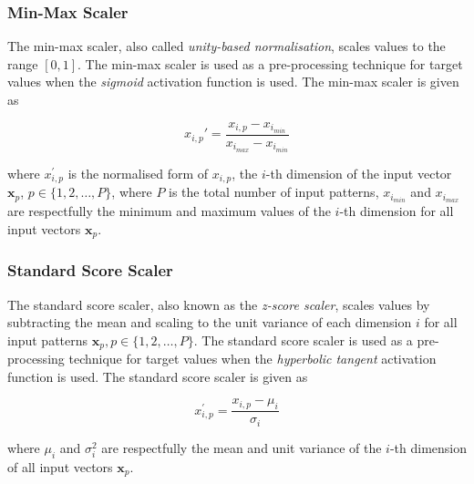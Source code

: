 \subsubsection{Min-Max Scaler}\label{sec:anns:an:input:min_max_scaler}

The min-max scaler, also called \textit{unity-based normalisation}, scales values to the range $[0,1]$. The min-max scaler is used as a pre-processing technique for target values when the \textit{sigmoid}  activation function is used. The min-max scaler is given as

\begin{equation}
      x_{i,p}'  = \frac{x_{i,p} - x_{i_{min}}}{x_{i_{max}} - x_{i_{min}}}
      \label{eq:min_max_scaler}
\end{equation}

where $x_{i,p}^{'}$ is the normalised form of $x_{i,p}$, the $i$-th dimension of the input vector $\boldsymbol{x}_p$, $p \in \{1,2, \dots, P \}$, where $P$ is the total number of input patterns, $x_{i_{min}}$ and $x_{i_{max}}$ are respectfully the minimum and maximum values of the $i$-th dimension for all input vectors $\boldsymbol{x}_p$.

\subsubsection{Standard Score Scaler}\label{sec:anns:an:input:standard_score_scaler}

The standard score scaler, also known as the \textit{z-score scaler}, scales values by subtracting the mean and scaling to the unit variance of each dimension $i$ for all input patterns $\boldsymbol{x}_p, p \in \{1,2, \dots, P\}$. The standard score scaler is used as a pre-processing technique for target values when the \textit{hyperbolic tangent} activation function is used. The standard score scaler is given as

\begin{equation}
      x_{i,p}^{'} = \frac{x_{i,p} - \mu_i}{\sigma_i}
      \label{eq:standard_score_scaler}
\end{equation}

where $\mu_i$ and $\sigma^2_i$ are respectfully the mean and unit variance of the $i$-th dimension of all input vectors $\boldsymbol{x}_p$.

